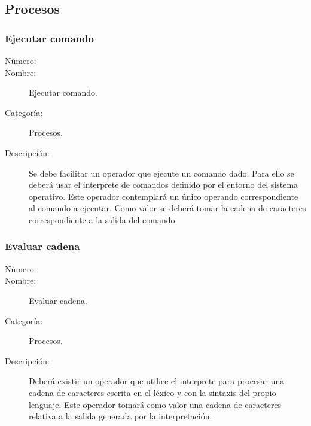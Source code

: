 \subsection{Procesos}

\subsubsection{Ejecutar comando}
	\begin{description}
		\item [Número:] \cn
		\item [Nombre:] Ejecutar comando.
		\item [Categoría:] Procesos.
		\item [Descripción:] Se debe facilitar un operador que ejecute un comando dado. 
		Para ello se deberá usar el interprete de comandos definido por el entorno del sistema operativo. Este operador contemplará
		un único operando correspondiente al comando a ejecutar. Como valor se deberá tomar la cadena de caracteres correspondiente 
		a la salida del comando.
	\end{description}

\subsubsection{Evaluar cadena}
	\begin{description}
		\item [Número:] \cn
		\item [Nombre:] Evaluar cadena.
		\item [Categoría:] Procesos.
		\item [Descripción:] Deberá existir un operador que utilice el interprete para procesar una cadena de caracteres escrita en 
		el léxico y con la sintaxis del propio lenguaje. Este operador tomará como valor una cadena de caracteres relativa a la salida 
		generada por la interpretación.
	\end{description}

